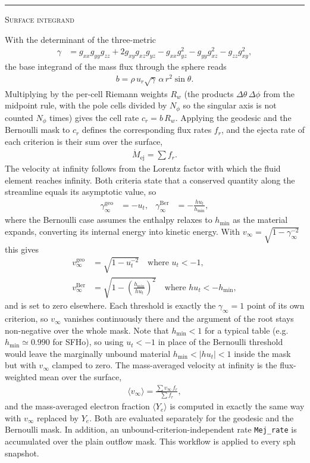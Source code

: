 \documentclass{article}
\newcommand{\var}[1]{%
  {\setlength{\fboxsep}{1.5pt}%
   \colorbox{varbg}{\textcolor{varfg}{\texttt{\small #1}}}}}
\newcommand{\step}[1]{%
  \par\medskip\noindent
  {\color{stepfg}\rule[-0.15ex]{2pt}{1.5ex}\hspace{0.5em}\scshape #1}%
  \hspace{0.75em}\ignorespaces}
\begin{document}
\step{Surface integrand} With the determinant of the three-metric
\begin{align}
  \gamma &= g_{xx}g_{yy}g_{zz}+2g_{xy}g_{xz}g_{yz}-g_{xx}g_{yz}^2-g_{yy}g_{xz}^2-g_{zz}g_{xy}^2,
\end{align}
the base integrand of the mass flux through the sphere reads
\begin{align}
  b = \rho\, u_r \sqrt{\gamma}\,\alpha\, r^2\sin{\theta}.
\end{align}
Multiplying by the per-cell Riemann weights $R_w$ (the products
$\Delta\theta\,\Delta\phi$ from the midpoint rule, with the pole cells divided by
$N_\phi$ so the singular axis is not counted $N_\phi$ times) gives the cell rate
$c_r = b\,R_w$. Applying the geodesic and the Bernoulli mask to $c_r$ defines the
corresponding flux rates $f_r$, and the ejecta rate of each criterion is their sum
over the surface,
\begin{align}
  \dot{M}_{\mathrm{ej}} = \sum f_r .
\end{align}
The velocity at infinity follows from the Lorentz factor with which the fluid element
reaches infinity. Both criteria state that a conserved quantity along the streamline
equals its asymptotic value, so
\begin{align}
  \gamma_{\infty}^{\mathrm{geo}} &= -u_t, &
  \gamma_{\infty}^{\mathrm{Ber}} &= -\frac{hu_t}{h_{\mathrm{min}}},
\end{align}
where the Bernoulli case assumes the enthalpy relaxes to $h_{\mathrm{min}}$ as the
material expands, converting its internal energy into kinetic energy. With
$v_{\infty}=\sqrt{1-\gamma_{\infty}^{-2}}$ this gives
\begin{align}
  v_{\infty}^{\mathrm{geo}} &= \sqrt{1-u_t^{-2}}\quad\text{where } u_t<-1,\\
  v_{\infty}^{\mathrm{Ber}} &= \sqrt{1-\left(\frac{h_{\mathrm{min}}}{hu_{t}}\right)^{2}}
                               \quad\text{where } hu_t<-h_{\mathrm{min}},
\end{align}
and is set to zero elsewhere. Each threshold is exactly the $\gamma_\infty=1$ point of
its own criterion, so $v_\infty$ vanishes continuously there and the argument of the
root stays non-negative over the whole mask. Note that $h_{\mathrm{min}}<1$ for a
typical table (e.g.\ $h_{\mathrm{min}}\simeq0.990$ for SFHo), so using $u_t<-1$ in place
of the Bernoulli threshold would leave the marginally unbound material
$h_{\mathrm{min}}<|hu_t|<1$ inside the mask but with $v_\infty$ clamped to zero. The mass-averaged velocity at infinity is the
flux-weighted mean over the surface,
\begin{align}
  \langle v_{\infty} \rangle = \frac{\sum v_{\infty}\, f_r}{\sum f_r},
\end{align}
and the mass-averaged electron fraction $\langle Y_e \rangle$ is computed in exactly
the same way with $v_\infty$ replaced by $Y_e$. Both are evaluated separately for the
geodesic and the Bernoulli mask. In addition, an unbound-criterion-independent rate
\var{Mej\_rate} is accumulated over the plain outflow mask. This workflow is applied
to every sph snapshot.
\end{document}
